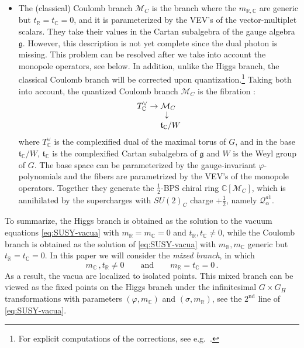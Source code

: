 \documentclass[12pt,a4paper]{article}
\renewcommand{\(}{\left(}
\renewcommand{\)}{\right)}
\renewcommand{\(}{\left(}
\renewcommand{\)}{\right)}
\begin{document}
\begin{itemize}
\item The (classical) Coulomb branch $\mathcal{M}_C$ is the branch where the $m_{\mathbb{R},\mathbb{C}}$ are generic but $t_{\mathbb{R}}=t_{\mathbb{C}}=0$, and it is parameterized by the VEV's of the vector-multiplet scalars. They take their values in the Cartan subalgebra of the gauge algebra $\mathfrak{g}$.
However, this description is not yet complete since the dual photon is missing. 
This problem can be resolved after we take into account the monopole operators, see below.
In addition, unlike the Higgs branch, the classical Coulomb branch will be corrected upon quantization.\footnote{For explicit computations of the corrections, see e.g.\ \cite{Intriligator:1996ex,Seiberg:1996nz}.} 
Taking both into account, the quantized Coulomb branch $\mathcal{M}_C$ is the fibration \cite{bullimore2015coulomb,Nakajima:2015txa,Braverman:2016wma}:
\begin{equation}
\begin{aligned}
T^{\vee}_{\mathbb{C}}\rightarrow{}&\mathcal{M}_C\\[-1ex]
&\ \hspace{-.2ex}\downarrow\\[-.5ex]
&\mathfrak{t}_{\mathbb{C}}/W
\end{aligned}
\end{equation}
where $T^{\vee}_{\mathbb{C}}$ is the complexified dual of the maximal torus of $G$, and in the base $\mathfrak{t}_{\mathbb{C}}/W$, $\mathfrak{t}_{\mathbb{C}}$ is the complexified Cartan subalgebra of $\mathfrak{g}$ and $W$ is the Weyl group of $G$. 
The base space can be parameterized by the gauge-invariant $\varphi$-polynomials and the fibers are parametrized by the VEV's of the monopole operators. 
Together they generate the $\frac{1}{2}$-BPS chiral ring $\mathbb{C}[\mathcal{M}_C]$, which is annihilated by the supercharges with $SU(2)_C$ charge $+\frac{1}{2}$, namely $\mathcal{Q}^{a\dot{1}}_{\alpha}$. 
\end{itemize}





\medskip
To summarize, the Higgs branch is obtained as the solution to the vacuum equations \eqref{eq:SUSY-vacua} with $m_{\mathbb{R}}=m_{\mathbb{C}}=0$ and $t_{\mathbb{R}},t_{\mathbb{C}}\neq 0$, while the Coulomb branch is obtained as the solution of \eqref{eq:SUSY-vacua} with $m_{\mathbb{R}},m_{\mathbb{C}}$ generic but $t_{\mathbb{R}}=t_{\mathbb{C}}= 0$. 
In this paper we will consider the \textit{mixed branch}, in which
\begin{equation}\label{eq:Mixed}
m_{\mathbb{C}}\,, t_{\mathbb{R}}\neq 0
\qquad\textrm{and}\qquad
m_{\mathbb{R}}=t_{\mathbb{C}}=0\,.
\end{equation}
As a result, the vacua are localized to isolated points. This mixed branch can be viewed as the fixed points on the Higgs branch under the infinitesimal $G\times G_H$ transformations with parameters $(\varphi,m_{\mathbb{C}})$ and $(\sigma,m_{\mathbb{R}})$, see the $2^{\text{nd}}$ line of \eqref{eq:SUSY-vacua}.
\end{document}
